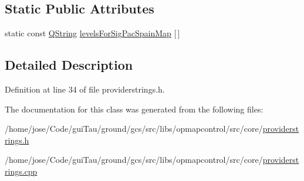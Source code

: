 \subsection*{Static Public Attributes}
\begin{DoxyCompactItemize}
\item 
static const \hyperlink{group___u_a_v_objects_plugin_gab9d252f49c333c94a72f97ce3105a32d}{Q\-String} \hyperlink{group___o_p_map_widget_ga8e0c0e07bd5f4a133451306c0603f393}{levels\-For\-Sig\-Pac\-Spain\-Map} \mbox{[}$\,$\mbox{]}
\end{DoxyCompactItemize}


\subsection{Detailed Description}


Definition at line 34 of file providerstrings.\-h.



The documentation for this class was generated from the following files\-:\begin{DoxyCompactItemize}
\item 
/home/jose/\-Code/gui\-Tau/ground/gcs/src/libs/opmapcontrol/src/core/\hyperlink{providerstrings_8h}{providerstrings.\-h}\item 
/home/jose/\-Code/gui\-Tau/ground/gcs/src/libs/opmapcontrol/src/core/\hyperlink{providerstrings_8cpp}{providerstrings.\-cpp}\end{DoxyCompactItemize}
